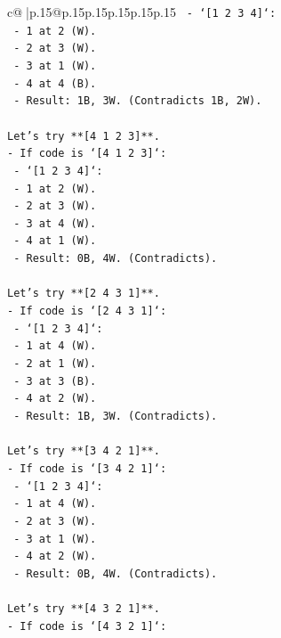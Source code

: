 \documentclass{article}
\begin{document}
{\begin{supertabular}{c@{$\;$}|p{.15\linewidth}@{}p{.15\linewidth}p{.15\linewidth}p{.15\linewidth}p{.15\linewidth}p{.15\linewidth}}
{{{\texttt{    {-} `{[}1 2 3 4{]}`:} \\
\texttt{      {-} 1 at 2 (W).} \\
\texttt{      {-} 2 at 3 (W).} \\
\texttt{      {-} 3 at 1 (W).} \\
\texttt{      {-} 4 at 4 (B).} \\
\texttt{      {-} Result: 1B, 3W. (Contradicts 1B, 2W).} \\
\\ 
\texttt{Let's try **{[}4 1 2 3{]}**.} \\
\texttt{{-} If code is `{[}4 1 2 3{]}`:} \\
\texttt{  {-} `{[}1 2 3 4{]}`:} \\
\texttt{    {-} 1 at 2 (W).} \\
\texttt{    {-} 2 at 3 (W).} \\
\texttt{    {-} 3 at 4 (W).} \\
\texttt{    {-} 4 at 1 (W).} \\
\texttt{    {-} Result: 0B, 4W. (Contradicts).} \\
\\ 
\texttt{Let's try **{[}2 4 3 1{]}**.} \\
\texttt{{-} If code is `{[}2 4 3 1{]}`:} \\
\texttt{  {-} `{[}1 2 3 4{]}`:} \\
\texttt{    {-} 1 at 4 (W).} \\
\texttt{    {-} 2 at 1 (W).} \\
\texttt{    {-} 3 at 3 (B).} \\
\texttt{    {-} 4 at 2 (W).} \\
\texttt{    {-} Result: 1B, 3W. (Contradicts).} \\
\\ 
\texttt{Let's try **{[}3 4 2 1{]}**.} \\
\texttt{{-} If code is `{[}3 4 2 1{]}`:} \\
\texttt{  {-} `{[}1 2 3 4{]}`:} \\
\texttt{    {-} 1 at 4 (W).} \\
\texttt{    {-} 2 at 3 (W).} \\
\texttt{    {-} 3 at 1 (W).} \\
\texttt{    {-} 4 at 2 (W).} \\
\texttt{    {-} Result: 0B, 4W. (Contradicts).} \\
\\ 
\texttt{Let's try **{[}4 3 2 1{]}**.} \\
\texttt{{-} If code is `{[}4 3 2 1{]}`:} \\
}}}
\end{supertabular}}
\end{document}
